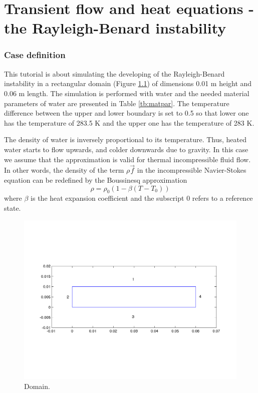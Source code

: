 \chapter{Transient flow and heat equations - the Rayleigh-Benard instability}



\subsection*{Case definition}
\begin{flushleft}
This tutorial is about simulating the developing of the Rayleigh-Benard instability in a rectangular domain 
(Figure \ref{fg:rb_geometry}) of dimensions 0.01 m height and 0.06 m length. The simulation is performed with water and the needed material parameters of water are presented in Table \ref{tb:matpar}. The temperature difference between the upper and lower boundary is set to 0.5 so that lower one has the temperature of  283.5 K and the upper one has the temperature of 283 K.



The density of water is inversely proportional to its temperature. Thus, heated water starts to flow upwards, and colder downwards due to gravity. 
In this case we assume that the  approximation is valid for thermal incompressible fluid flow. In other words, the density of the term $\rho$$\vec{f}$ in the incompressible Navier-Stokes equation can be redefined by the Boussinesq approximation
\begin{displaymath}
\rho = {\rho}_0(1-\beta(T-{T}_0))
\end{displaymath}
where $\beta$ is the heat expansion coefficient and the subscript 0 refers to a reference state.


\begin{figure}[h]
\centering
\includegraphics[width=150 mm, height=55 mm]{rb_geometry}
\caption{Domain.}\label{fg:rb_geometry}
\end{figure}  



\end{flushleft}
